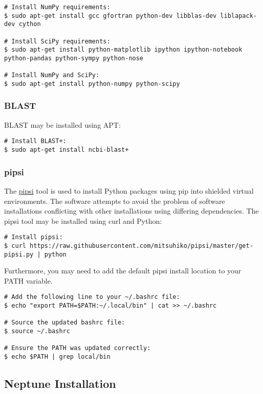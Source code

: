 \documentclass[a4paper,10pt]{article}
\begin{document}
\begin{lstlisting}
# Install NumPy requirements:
$ sudo apt-get install gcc gfortran python-dev libblas-dev liblapack-dev cython

# Install SciPy requirements:
$ sudo apt-get install python-matplotlib ipython ipython-notebook python-pandas python-sympy python-nose

# Install NumPy and SciPy:
$ sudo apt-get install python-numpy python-scipy
\end{lstlisting}

\subsubsection{BLAST}

BLAST may be installed using APT:

\begin{lstlisting}
# Install BLAST+:
$ sudo apt-get install ncbi-blast+
\end{lstlisting}

\subsubsection{pipsi}

The \href{https://github.com/mitsuhiko/pipsi}{pipsi} tool is used to install Python packages using pip into shielded virtual environments. The software attempts to avoid the problem of software installations conflicting with other installations using differing dependencies. The pipsi tool may be installed using curl and Python:

\begin{lstlisting}
# Install pipsi:
$ curl https://raw.githubusercontent.com/mitsuhiko/pipsi/master/get-pipsi.py | python
\end{lstlisting}

Furthermore, you may need to add the default pipsi install location to your PATH variable.

\begin{lstlisting}
# Add the following line to your ~/.bashrc file:
$ echo "export PATH=$PATH:~/.local/bin" | cat >> ~/.bashrc

# Source the updated bashrc file:
$ source ~/.bashrc

# Ensure the PATH was updated correctly:
$ echo $PATH | grep local/bin
\end{lstlisting}

\subsection{Neptune Installation}
\end{document}
